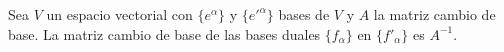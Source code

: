 \begin{result}
  \label{res:dual_cambio_base}
  Sea $V$ un espacio vectorial con $\{e^\alpha\}$ y $\{e'^\alpha\}$ bases de $V$ y $A$ la matriz cambio de base.
  La matriz cambio de base de las bases duales $\{f_\alpha\}$ en $\{f'_\alpha\}$ es $A^{-1}$.

\end{result}
